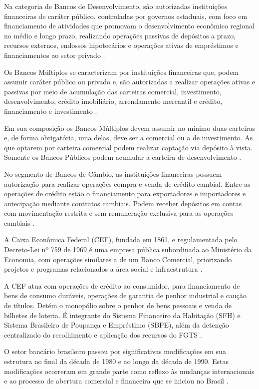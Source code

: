 \documentclass[12pt,openright,oneside,a4paper,chapter=TITLE,section=TITLE,subsection=Title,english,french,spanish,portugues,sumario=tradicional]{04-class-files/abntex2}
\begin{document}
Na categoria de Bancos de Desenvolvimento, são autorizadas instituições
financeiras de caráter público, controladas por governos estaduais, com foco em
financiamento de atividades que promovam o desenvolvimento econômico regional
no médio e longo prazo, realizando operações passivas de depósitos a prazo,
recursos externos, endossos hipotecários e operações ativas de empréstimos e
financiamentos ao setor privado \cite{Res:394:1976}.

Os Bancos Múltiplos se caracterizam por instituições financeiras que, podem
assumir caráter público ou privado e, são autorizadas a realizar operações
ativas e passivas por meio de acumulação das carteiras comercial, investimento,
desenvolvimento, crédito imobiliário, arrendamento mercantil e crédito, financiamento e investimento \cite{Res:2099:1994}.

Em sua composição os Bancos Múltiplos devem assumir no mínimo duas carteiras e,
de forma obrigatória, uma delas, deve ser a comercial ou a de investimento. As
que optarem por carteira comercial podem realizar captação via depósito à vista. Somente os Bancos Públicos podem acumular a carteira de desenvolvimento
\cite{Res:2099:1994}.

No segmento de Bancos de Câmbio, as instituições financeiras possuem
autorização para realizar operações compra e venda de crédito cambial. Entre as
operações de crédito estão o financiamento para exportadores e importadores e
antecipação mediante contratos cambiais. Podem receber depósitos em contas com
movimentação restrita e sem remuneração exclusiva para as operações cambiais
\cite{Res:3426:2006}.

A Caixa Econômica Federal (CEF), fundada em 1861, e regulamentada pelo
Decreto-Lei nº 759 de 1969 é uma empresa pública subordinada ao Ministério da
Economia, com operações similares a de um Banco Comercial, priorizando projetos
e programas relacionados a área social e infraestrutura \cite{DL:759:1969}.

A CEF atua com operações de crédito ao consumidor, para financiamento de bens
de consumo duráveis, operações de garantia de penhor industrial e caução de
títulos. Detém o monopólio sobre o penhor de bens pessoais e venda de bilhetes
de loteria. É integrante do Sistema Financeiro da Habitação (SFH) e Sistema
Brasileiro de Poupança e Empréstimo (SBPE), além da detenção centralizado do
recolhimento e aplicação dos recursos do FGTS \cite{DL:759:1969}.

O setor bancário brasileiro passou por significativas modificações em sua
estrutura no final da década de 1980 e ao longo da década de 1990. Estas
modificações ocorreram em grande parte como reflexo às mudanças internacionais
e ao processo de abertura comercial e financeira que se iniciou no Brasil
\cite{camargo:2009}.
\end{document}
